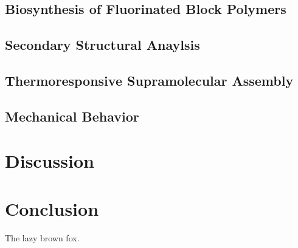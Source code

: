\subsection{Biosynthesis of Fluorinated Block Polymers}

\subsection{Secondary Structural Anaylsis}

\subsection{Thermoresponsive Supramolecular Assembly}

\subsection{Mechanical Behavior}


\section{Discussion}

\section{Conclusion}

The lazy brown fox.

\printbibliography
